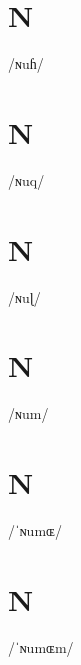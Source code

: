 \documentclass[10pt,a4paper,twoside]{book}
\begin{document}
\section*{N}

\begin{multicols}{3}
 {/ɴuɦ/} {}
\end{multicols}

\section*{N}

\begin{multicols}{3}
 {/ɴuq/} {}
\end{multicols}

\section*{N}

\begin{multicols}{3}
 {/ɴuɭ/} {}
\end{multicols}

\section*{N}

\begin{multicols}{3}
 {/ɴum/} {}
\end{multicols}

\section*{N}

\begin{multicols}{3}
 {/ˈɴumɶ/} {}
\end{multicols}

\section*{N}

\begin{multicols}{3}
 {/ˈɴumɶm/} {}
\end{multicols}
\end{document}
